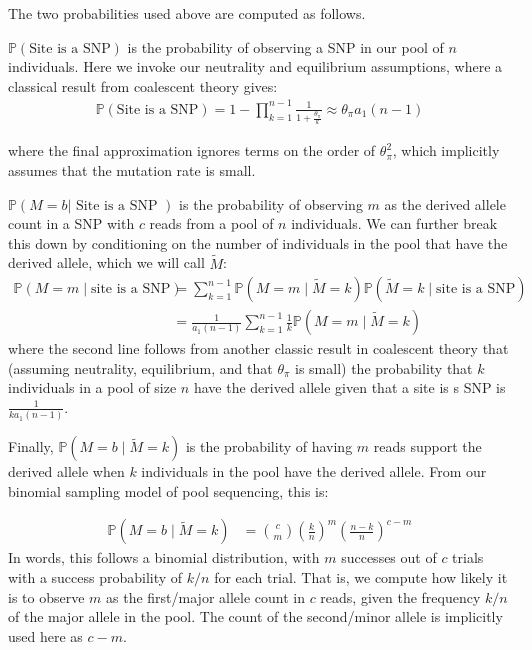 \documentclass[a4paper,fontsize=9pt,DIV=14]{scrartcl}
\newcommand{\samplesize}{n}
\newcommand{\coverage}{c}
\begin{document}
The two probabilities used above are computed as follows.

$\mathbb{P}\left(\text{Site is a SNP}\right)$ is the probability of observing a SNP in our pool of $\samplesize$ individuals.  Here we invoke our neutrality and equilibrium assumptions, where a classical result from coalescent theory gives:
%
\begin{align}
\label{eq:PSNP}
\mathbb{P}\left(\text{Site is a SNP}\right) = 1- \prod_{k=1}^{\samplesize-1} \frac{1}{1+\frac{\theta_\pi}{k}} \approx \theta_\pi a_1(n-1)
\end{align}

where the final approximation ignores terms on the order of  $\theta_\pi^2$, which implicitly assumes that the mutation rate is small.

$\mathbb{P}\left(M = b | \text{ Site is a SNP }\right)$ is the probability of observing $m$ as the derived allele count in a SNP with $\coverage$ reads from a pool of $n$ individuals.  We can further break this down by conditioning on the number of individuals in the pool that have the derived allele, which we will call $\tilde{M}$:
%
\begin{align}
    \label{eq:Pmcn}
    \mathbb{P}\left(M = m \mid \text{site is a SNP}\right) &= \sum_{k=1}^{n-1} \mathbb{P}\left(M=m \mid \tilde{M} = k\right)\mathbb{P} \left( \tilde{M} = k \mid \text{site is a SNP}\right)\\
    &= \frac{1}{a_1(n-1)}  \sum_{k=1}^{n-1} \frac{1}{k}  \mathbb{P}\left(M=m \mid\tilde{M} = k\right)
\end{align}
where the second line follows from another classic result in coalescent theory that (assuming neutrality, equilibrium, and that $\theta_\pi$ is small) the probability that $k$ individuals in a pool of size $\samplesize$ have the derived allele given that a site is s SNP is $\frac{1}{ka_1(n-1)}$.

Finally, $ \mathbb{P}\left(M=b \mid \tilde{M} = k\right)$ is the probability of having $m$ reads support the derived allele when $k$ individuals in the pool have the derived allele.  From our binomial sampling model of pool sequencing, this is:

%
\begin{align}
    \label{eq:Pmcnk}
     \mathbb{P}\left(M=b \mid \tilde{M} = k\right) &= \binom{\coverage}{m} \left(\frac{k}{\samplesize}\right)^m \left(\frac{\samplesize-k}{\samplesize}\right)^{\coverage-m}
\end{align}
%
In words, this follows a binomial distribution, with $m$ successes out of $c$ trials
with a success probability of $k/n$ for each trial.
That is, we compute how likely it is to observe $m$ as the first/major allele count in $c$ reads,
given the frequency $k/n$ of the major allele in the pool.
The count of the second/minor allele is implicitly used here as $c-m$.
\end{document}
